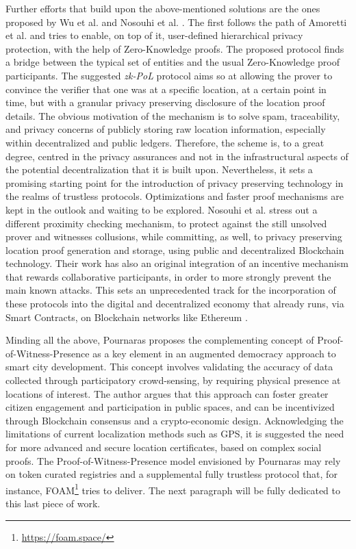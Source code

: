 Further efforts that build upon the above-mentioned solutions are the ones proposed by Wu et al. \cite{wu2020blockchain} and Nosouhi et al. \cite{nosouhi2020blockchain}. The first follows the path of Amoretti et al. \cite{amoretti2018blockchain} and tries to enable, on top of it, user-defined hierarchical privacy protection, with the help of Zero-Knowledge proofs. The proposed protocol finds a bridge between the typical \pol{} set of entities and the usual Zero-Knowledge proof participants. The suggested \emph{zk-PoL} protocol aims so at allowing the prover to convince the verifier that one was at a specific location, at a certain point in time, but with a granular privacy preserving disclosure of the location proof details. The obvious motivation of the mechanism is to solve spam, traceability, and privacy concerns of publicly storing raw location information, especially within decentralized and public ledgers. Therefore, the scheme is, to a great degree, centred in the privacy assurances and not in the infrastructural aspects of the potential decentralization that it is built upon. Nevertheless, it sets a promising starting point for the introduction of privacy preserving technology in the realms of trustless \pol{} protocols. Optimizations and faster proof mechanisms are kept in the outlook and waiting to be explored. Nosouhi et al. \cite{nosouhi2020blockchain} stress out a different proximity checking mechanism, to protect against the still unsolved prover and witnesses collusions, while committing, as well, to privacy preserving location proof generation and storage, using public and decentralized Blockchain technology. Their work has also an original integration of an incentive mechanism that rewards collaborative participants, in order to more strongly prevent the main known attacks. This sets an unprecedented track for the incorporation of these \pol{} protocols into the digital and decentralized economy that already runs, via Smart Contracts, on Blockchain networks like Ethereum \cite{nosouhi2020blockchain, buterin2014next}. 

Minding all the above, Pournaras \cite{pournaras2020proof} proposes the complementing concept of Proof-of-Witness-Presence as a key element in an augmented democracy approach to smart city development. This concept involves validating the accuracy of data collected through participatory crowd-sensing, by requiring physical presence at locations of interest. The author argues that this approach can foster greater citizen engagement and participation in public spaces, and can be incentivized through Blockchain consensus and a crypto-economic design. Acknowledging the limitations of current localization methods such as GPS, it is suggested the need for more advanced and secure location certificates, based on complex social proofs. The Proof-of-Witness-Presence model envisioned by Pournaras may rely on token curated registries and a supplemental fully trustless \pol{} protocol that, for instance, FOAM\footnote{\url{https://foam.space/}} tries to deliver. The next paragraph will be fully dedicated to this last piece of work.


